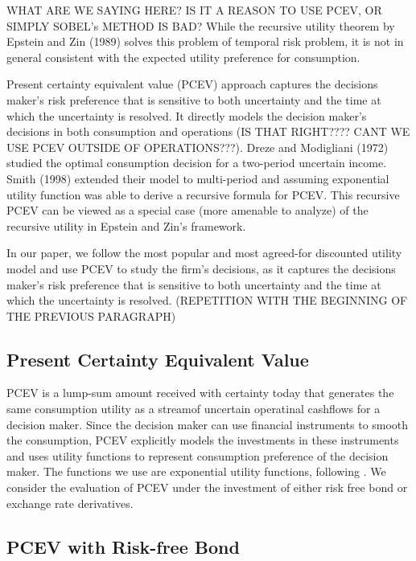 \documentclass[mnsc,nonblindrev,copyedit]{informs2_wz} %
\begin{document}
WHAT ARE WE SAYING HERE?  IS IT A REASON TO USE PCEV, OR SIMPLY SOBEL's METHOD IS BAD?  
While the recursive utility theorem by Epstein and Zin (1989) solves this problem of temporal risk problem, it is not in general consistent with the expected utility preference for consumption. 


Present certainty equivalent value (PCEV) approach captures the decisions maker's risk preference that is sensitive to both uncertainty and the time at which the uncertainty is resolved.
It directly models the decision maker's decisions in both consumption and operations (IS THAT RIGHT???? CANT WE USE PCEV OUTSIDE OF OPERATIONS???). Dreze and Modigliani (1972) studied the optimal consumption decision for a two-period uncertain income. Smith (1998) extended their model to multi-period and assuming exponential utility function was able to derive a recursive formula for PCEV. This recursive PCEV can be viewed as a special case (more amenable to analyze) of the recursive utility in Epstein and Zin's framework. 


In our paper, we follow the most popular and most agreed-for discounted utility model and use PCEV to study the firm's decisions, as it captures the decisions maker's risk preference that is sensitive to both uncertainty and the time at which the uncertainty is resolved. (REPETITION WITH THE BEGINNING OF THE PREVIOUS PARAGRAPH)




\subsection{ Present Certainty Equivalent Value \label{sect:pcev}}

PCEV is a lump-sum amount received with certainty today that generates the same consumption utility as a streamof uncertain operatinal cashflows for a decision maker. Since the decision maker can use financial instruments to smooth the consumption, PCEV explicitly models the investments in these instruments and uses utility functions to represent consumption preference of the decision maker. The functions we use are exponential utility functions, following \cite{smith1998}. We consider the evaluation of PCEV under the investment of either risk free bond or exchange rate derivatives.


\subsection{PCEV with Risk-free Bond}
\end{document}
